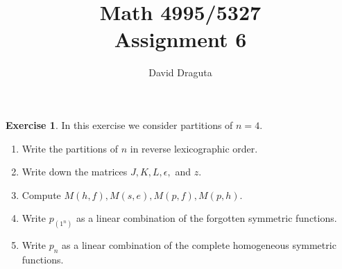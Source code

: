 \documentclass[12pt]{extarticle}
\title{ Math 4995/5327
  \\
  Assignment 6}
\author{David Draguta}
\newcommand{\<}{\langle}
\renewcommand{\>}{\rangle}
\theoremstyle{definition}
\newtheorem{exercise}{Exercise}
\begin{document}
\maketitle

\begin{exercise}
  In this exercise we consider partitions of $n=4$.
  \begin{enumerate}
  \item
    Write the partitions of $n$ in reverse lexicographic order.
  \item
    Write down the matrices $J,K,L,\epsilon,$ and $z$.
  \item
    Compute $M(h,f), M(s,e), M(p,f), M(p,h)$.
  \item
    Write $p_{(1^n)}$ as a linear combination of the forgotten symmetric functions.
  \item
    Write $p_n$ as a linear combination of the complete homogeneous symmetric functions. 
  \end{enumerate}
\end{exercise}
\end{document}
